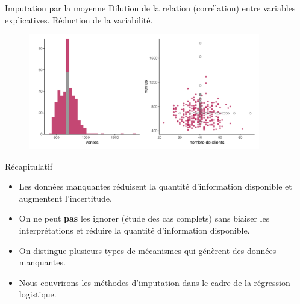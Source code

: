 \documentclass[
  ignorenonframetext,
]{beamer}
\providecommand{\tightlist}{%
  \setlength{\itemsep}{0pt}\setlength{\parskip}{0pt}}\usepackage{longtable,booktabs,array}
\begin{document}
\begin{frame}{Imputation par la moyenne}
\protect\hypertarget{imputation-par-la-moyenne}{}
Dilution de la relation (corrélation) entre variables explicatives.
Réduction de la variabilité.

\begin{figure}

{\centering \includegraphics[width=0.9\textwidth,height=\textheight]{MATH60602-diapos1_files/figure-beamer/unnamed-chunk-16-1.pdf}

}

\end{figure}
\end{frame}

\begin{frame}{Récapitulatif}
\protect\hypertarget{ruxe9capitulatif}{}
\begin{itemize}
\tightlist
\item
  Les données manquantes réduisent la quantité d'information disponible
  et augmentent l'incertitude.
\item
  On ne peut \textbf{pas} les ignorer (étude des cas complets) sans
  biaiser les interprétations et réduire la quantité d'information
  disponible.
\item
  On distingue plusieurs types de mécanismes qui génèrent des données
  manquantes.
\item
  Nous couvrirons les méthodes d'imputation dans le cadre de la
  régression logistique.
\end{itemize}
\end{frame}
\end{document}
